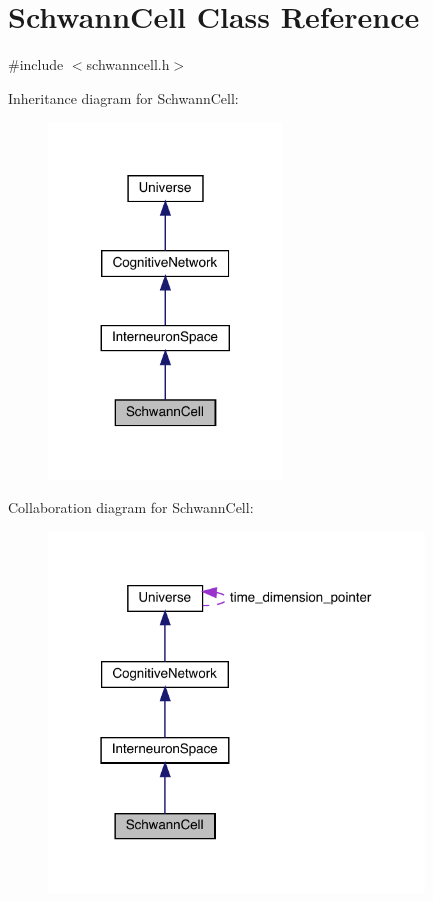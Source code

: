 \hypertarget{class_schwann_cell}{}\section{Schwann\+Cell Class Reference}
\label{class_schwann_cell}


{\ttfamily \#include $<$schwanncell.\+h$>$}



Inheritance diagram for Schwann\+Cell\+:\nopagebreak
\begin{figure}[H]
\begin{center}
\leavevmode
\includegraphics[width=176pt]{class_schwann_cell__inherit__graph}
\end{center}
\end{figure}


Collaboration diagram for Schwann\+Cell\+:
\nopagebreak
\begin{figure}[H]
\begin{center}
\leavevmode
\includegraphics[width=283pt]{class_schwann_cell__coll__graph}
\end{center}
\end{figure}
